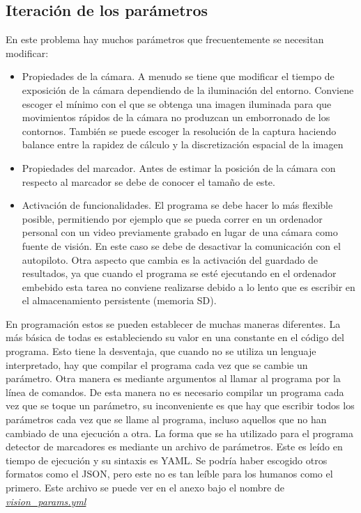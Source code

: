 \subsection{Iteración de los parámetros}

En este problema hay muchos parámetros que frecuentemente se necesitan modificar:
\begin{itemize}
\item Propiedades de la cámara. A menudo se tiene que modificar el tiempo de exposición de la cámara dependiendo de la iluminación del entorno. Conviene escoger el mínimo con el que se obtenga una imagen iluminada para que movimientos rápidos de la cámara no produzcan un emborronado de los contornos. También se puede escoger la resolución de la captura haciendo balance entre la rapidez de cálculo y la discretización espacial de la imagen 
\item Propiedades del marcador. Antes de estimar la posición de la cámara con respecto al marcador se debe de conocer el tamaño de este.
\item Activación de funcionalidades. El programa se debe hacer lo más flexible posible, permitiendo por ejemplo que se pueda correr en un ordenador personal con un video previamente grabado en lugar de una cámara como fuente de visión. En este caso se debe de desactivar la comunicación con el autopiloto. Otra aspecto que cambia es la activación del guardado de resultados, ya que cuando el programa se esté ejecutando en el ordenador embebido esta tarea no conviene realizarse debido a lo lento que es escribir en el almacenamiento persistente (memoria SD).  
\end{itemize}

En programación estos se pueden establecer de muchas maneras diferentes. La más básica de todas es estableciendo su valor en una constante en el código del programa. Esto tiene la desventaja, que cuando no se utiliza un lenguaje interpretado, hay que compilar el programa cada vez que se cambie un parámetro. Otra manera es mediante argumentos al llamar al programa por la línea de comandos. De esta manera no es necesario compilar un programa cada vez que se toque un parámetro, su inconveniente es que hay que escribir todos los parámetros cada vez que se llame al programa, incluso aquellos que no han cambiado de una ejecución a otra. La forma que se ha utilizado para el programa detector de marcadores es mediante un archivo de parámetros. Este es leído en tiempo de ejecución  y su sintaxis es YAML. Se podría haber escogido otros formatos como el JSON, pero este no es tan leíble para los humanos como el primero. Este archivo se puede ver en el anexo bajo el nombre de \hyperref[sec:vision-params]{\textit{vision\_params.yml}} 


